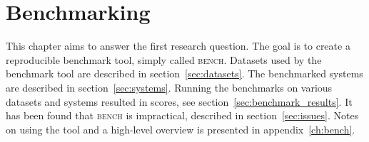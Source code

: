 \chapter{Benchmarking}
\label{ch:benchmarking}

This chapter aims to answer the first research question.
The goal is to create a reproducible benchmark tool, simply called \textsc{bench}.
Datasets used by the benchmark tool are described in section~\ref{sec:datasets}.
The benchmarked systems are described in section~\ref{sec:systems}.
Running the benchmarks on various datasets and systems resulted in scores, see section~\ref{sec:benchmark_results}.
It has been found that \textsc{bench} is impractical, described in section~\ref{sec:issues}.
Notes on using the tool and a high-level overview is presented in appendix~\ref{ch:bench}.








